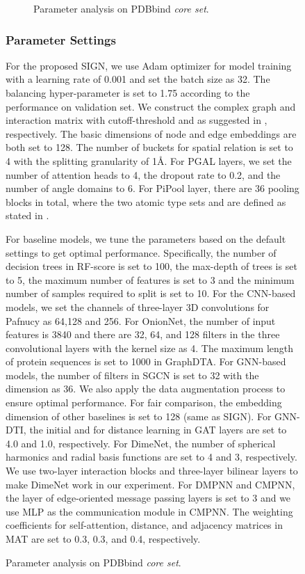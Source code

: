 \documentclass[sigconf]{acmart}
\newcommand{\model}{\textsf{SIGN}\xspace}
\newcommand{\gnn}{PGAL\xspace}
\newcommand{\pool}{PiPool\xspace}
\begin{document}
\begin{figure}
\begin{figure}
\setlength{\abovecaptionskip}{2.mm}
\setlength{\belowcaptionskip}{-0.cm}
  \centering
  \vspace{-2mm}
  \caption{Parameter analysis on PDBbind \textit{core set}.}
  \vspace{-4mm}
  \label{fig-parameter-add} \end{figure}



\subsubsection{Parameter Settings}
For the proposed \model, we use Adam optimizer for model training with a learning rate of 0.001 and set the batch size as 32. The balancing hyper-parameter  is set to 1.75 according to the performance on validation set. We construct the complex graph and interaction matrix with cutoff-threshold  and  as suggested in \cite{muegge1999general}, respectively. The basic dimensions of node and edge embeddings are both set to 128. The number of buckets for spatial relation  is set to 4 with the splitting granularity of 1Å. For \gnn layers, we set the number of attention heads  to 4, the dropout rate to 0.2, and the number of angle domains  to 6. For \pool layer, there are 36 pooling blocks in total, where the two atomic type sets  and  are defined as stated in \cite{ballester2010machine}. 


For baseline models, we tune the parameters based on the default settings to get optimal performance. Specifically, the number of decision trees in RF-score is set to 100, the max-depth of trees is set to 5, the maximum number of features is set to 3 and the minimum number of samples required to split is set to 10. For the CNN-based models, we set the channels of three-layer 3D convolutions for Pafnucy as 64,128 and 256. For OnionNet, the number of input features is 3840 and there are 32, 64, and 128 filters in the three convolutional layers with the kernel size as 4. The maximum length of protein sequences is set to 1000 in GraphDTA. For GNN-based models, the number of filters in SGCN is set to 32 with the dimension as 36. We also apply the data augmentation process to ensure optimal performance. For fair comparison, the embedding dimension of other baselines is set to 128 (same as \model). For GNN-DTI, the initial  and  for distance learning in GAT layers are set to 4.0 and 1.0, respectively. For DimeNet, the number of spherical harmonics and radial basis functions are set to 4 and 3, respectively. We use two-layer interaction blocks and three-layer bilinear layers to make DimeNet work in our experiment. For DMPNN and CMPNN, the layer of edge-oriented message passing layers is set to 3 and we use MLP as the communication module in CMPNN. The weighting 
coefficients for self-attention, distance, and adjacency matrices in MAT are set to 0.3, 0.3, and 0.4, respectively.
\vspace{-2mm}

\end{figure}
\end{document}
